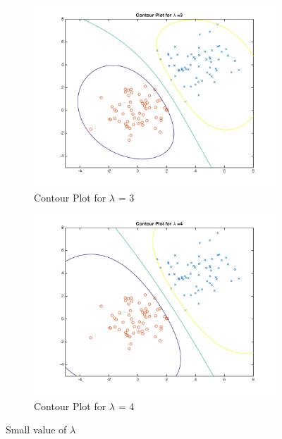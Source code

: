 \documentclass[english]{article}
\begin{document}
\begin{figure}[!htbp]
\begin{subfigure}{0.48\textwidth}
\includegraphics[width=\linewidth]{../plotLambda/plot_3}
\caption{Contour Plot for $\lambda$ = 3} 
\end{subfigure}\hspace*{\fill}
\begin{subfigure}{0.48\textwidth}
\includegraphics[width=\linewidth]{../plotLambda/plot_4}
\caption{Contour Plot for $\lambda$ = 4} \label{fig:b}
\end{subfigure}
\caption{Small value of $\lambda$} \label{fig:1}
\end{figure}
\end{document}
